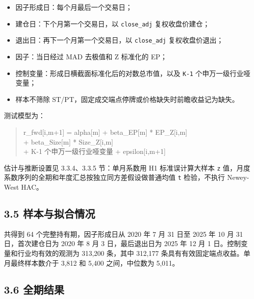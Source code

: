 \documentclass[UTF8,a4paper,11pt]{ctexart}
\begin{document}
\begin{itemize}[leftmargin=2em,itemsep=2pt,topsep=3pt]
\item 
因子形成日：每个月最后一个交易日；

\item 
建仓日：下个月第一个交易日，以 \texttt{close\_adj} 复权收盘价建仓；

\item 
退出日：再下一个月第一个交易日，以 \texttt{close\_adj} 复权收盘价退出；

\item 
因子：当日经过 MAD 去极值和 Z 标准化的 EP；

\item 
控制变量：形成日横截面标准化后的对数总市值，以及 \texttt{K-1} 个申万一级行业哑变量；

\item 
样本不筛除 ST/PT，固定成交端点停牌或价格缺失时前瞻收益记为缺失。

\end{itemize}

测试模型为：

\begin{quote}\ttfamily\small
r\_fwd[i,m+1] = alpha[m] + beta\_EP[m] * EP\_Z[i,m]\\
                 + beta\_Size[m] * Size\_Z[i,m]\\
                 + K-1 个申万一级行业哑变量 + epsilon[i,m+1]\\
\end{quote}

估计与推断设置见 3.3.4、3.3.5 节：单月系数用 H1 标准误计算大样本 \texttt{z} 值，月度系数序列的全期和年度汇总按独立同方差假设做普通均值 \texttt{t} 检验，不执行 Newey-West HAC。

{}
\subsection*{3.5 样本与拟合情况}

共得到 64 个完整持有期，因子形成日从 2020 年 7 月 31 日至 2025 年 10 月 31 日，首次建仓日为 2020 年 8 月 3 日，最后退出日为 2025 年 12 月 1 日。控制变量和行业均有效的观测为 313,200 条，其中 312,177 条具有有效固定端点收益。单月最终样本数介于 3,812 和 5,400 之间，中位数为 5,011。

{}
\subsection*{3.6 全期结果}
\end{document}

